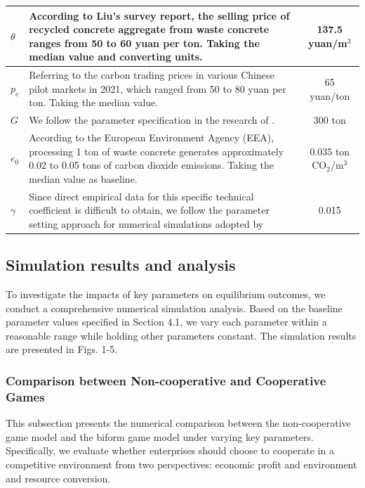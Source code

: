 \documentclass[authoryear,preprint,review,times,10pt]{elsarticle}
\begin{document}
\begin{table}[!htbp]
\begin{tabular}{lp{10cm}c}
\midrule
$\theta$ & According to Liu's survey report, the selling price of recycled concrete aggregate from waste concrete ranges from 50 to 60 yuan per ton. Taking the median value and converting units. & 137.5 yuan/m$^3$ \\
\midrule
$p_c$ & Referring to the carbon trading prices in various Chinese pilot markets in 2021, which ranged from 50 to 80 yuan per ton. Taking the median value. & 65 yuan/ton \\
\midrule
$G$ & We follow the parameter specification in the research of \cite{sun2021Optimal}. & 300 ton \\
\midrule
$e_0$ & According to the European Environment Agency (EEA), processing 1 ton of waste concrete generates approximately 0.02 to 0.05 tons of carbon dioxide emissions. Taking the median value as baseline. & 0.035 ton CO$_2$/m$^3$ \\
\midrule
$\gamma$ & Since direct empirical data for this specific technical coefficient is difficult to obtain, we follow the parameter setting approach for numerical simulations adopted by \citep{he2026EmissionReduction} & 0.015 \\
\bottomrule
\end{tabular}
\end{table}
\vspace{-15pt}

\subsection{Simulation results and analysis}
\label{sec:simulation_analysis}

To investigate the impacts of key parameters on equilibrium outcomes, we conduct a comprehensive numerical simulation analysis. Based on the baseline parameter values specified in Section 4.1, we vary each parameter within a reasonable range while holding other parameters constant. The simulation results are presented in Figs. 1-5.

\subsubsection{Comparison between Non-cooperative and Cooperative Games}
\label{sec:comparison}

This subsection presents the numerical comparison between the non-cooperative game model and the biform game model under varying key parameters. Specifically, we evaluate whether enterprises should choose to cooperate in a competitive environment from two perspectives: economic profit and environment and resource conversion.
\end{document}
